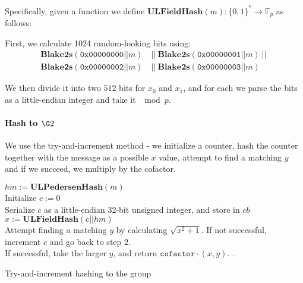 \documentclass[11pt]{article}
\numberwithin{figure}{section} %
\newcommand{\Fp}{\ensuremath{\mathbb{F}_p}\xspace}
\newcommand{\ulphash}{\ensuremath{\mathbf{ULPedersenHash}}\xspace}
\newcommand{\bhash}{\ensuremath{\mathbf{Blake2s}}\xspace}
\newcommand{\ulfieldhash}{\ensuremath{\mathbf{ULFieldHash}}\xspace}
\begin{document}
Specifically, given a function we define $\ulfieldhash(m): \{0,1\}^* \rightarrow \Fp$ as follows:

First, we calculate 1024 random-looking bits using:
\begin{align*}
\bhash(\texttt{0x00000000} || m) &\ ||\ \bhash(\texttt{0x00000001} || m)\ ||\ \\
\bhash(\texttt{0x00000002} || m) &\ ||\ \bhash(\texttt{0x00000003} || m)
\end{align*}

We then divide it into two $512$ bits for $x_0$ and $x_1$, and for each we parse the bits as a little-endian integer and take it $\mod p$.

\paragraph{Hash to $\G2$}
We use the try-and-increment method - we initialize a counter, hash the counter together with the message as a possible $x$ value, attempt to find a matching $y$ and if we succeed, we multiply by the cofactor.

\begin{algorithm}
	$hm := \ulphash(m)$ \\
	Initialize $c := 0$ \\
	Serialize $c$ as a little-endian 32-bit unsigned integer, and store in $cb$ \\
	$x := \ulfieldhash(c || hm)$ \\
	Attempt finding a matching $y$ by calculating $\sqrt{x^2 + 1}$. If not successful, increment $c$ and go back to step $2$. \\
	If successful, take the larger $y$, and return $\mathtt{cofactor} \cdot (x, y)$.
	.
	
	\caption{Try-and-increment hashing to the group}
\end{algorithm}




\end{document}
